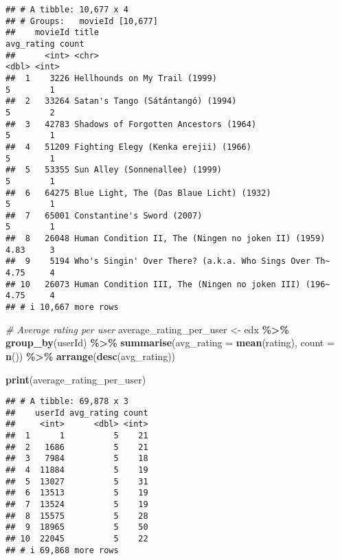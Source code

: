\documentclass[
]{article}
\newenvironment{Shaded}{\begin{snugshade}}{\end{snugshade}}
\newcommand{\AttributeTok}[1]{\textcolor[rgb]{0.13,0.29,0.53}{#1}}
\newcommand{\CommentTok}[1]{\textcolor[rgb]{0.56,0.35,0.01}{\textit{#1}}}
\newcommand{\FunctionTok}[1]{\textcolor[rgb]{0.13,0.29,0.53}{\textbf{#1}}}
\newcommand{\NormalTok}[1]{#1}
\newcommand{\OtherTok}[1]{\textcolor[rgb]{0.56,0.35,0.01}{#1}}
\newcommand{\SpecialCharTok}[1]{\textcolor[rgb]{0.81,0.36,0.00}{\textbf{#1}}}
\begin{document}
\begin{verbatim}
## # A tibble: 10,677 x 4
## # Groups:   movieId [10,677]
##    movieId title                                                avg_rating count
##      <int> <chr>                                                     <dbl> <int>
##  1    3226 Hellhounds on My Trail (1999)                              5        1
##  2   33264 Satan's Tango (Sátántangó) (1994)                          5        2
##  3   42783 Shadows of Forgotten Ancestors (1964)                      5        1
##  4   51209 Fighting Elegy (Kenka erejii) (1966)                       5        1
##  5   53355 Sun Alley (Sonnenallee) (1999)                             5        1
##  6   64275 Blue Light, The (Das Blaue Licht) (1932)                   5        1
##  7   65001 Constantine's Sword (2007)                                 5        1
##  8   26048 Human Condition II, The (Ningen no joken II) (1959)        4.83     3
##  9    5194 Who's Singin' Over There? (a.k.a. Who Sings Over Th~       4.75     4
## 10   26073 Human Condition III, The (Ningen no joken III) (196~       4.75     4
## # i 10,667 more rows
\end{verbatim}

\begin{Shaded}
\begin{Highlighting}[]
\CommentTok{\# Average rating per user}
\NormalTok{average\_rating\_per\_user }\OtherTok{\textless{}{-}}\NormalTok{ edx }\SpecialCharTok{\%\textgreater{}\%}
  \FunctionTok{group\_by}\NormalTok{(userId) }\SpecialCharTok{\%\textgreater{}\%}
  \FunctionTok{summarise}\NormalTok{(}\AttributeTok{avg\_rating =} \FunctionTok{mean}\NormalTok{(rating), }\AttributeTok{count =} \FunctionTok{n}\NormalTok{()) }\SpecialCharTok{\%\textgreater{}\%}
  \FunctionTok{arrange}\NormalTok{(}\FunctionTok{desc}\NormalTok{(avg\_rating))}

\FunctionTok{print}\NormalTok{(average\_rating\_per\_user)}
\end{Highlighting}
\end{Shaded}

\begin{verbatim}
## # A tibble: 69,878 x 3
##    userId avg_rating count
##     <int>      <dbl> <int>
##  1      1          5    21
##  2   1686          5    21
##  3   7984          5    18
##  4  11884          5    19
##  5  13027          5    31
##  6  13513          5    19
##  7  13524          5    19
##  8  15575          5    28
##  9  18965          5    50
## 10  22045          5    22
## # i 69,868 more rows
\end{verbatim}
\end{document}
